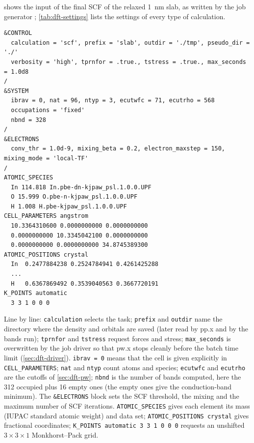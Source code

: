  shows the input of the final SCF of the relaxed 1~nm slab, as written by the job
generator ; \cref{tab:dft-settings} lists the settings of every type of
calculation.

\begin{lstlisting}[numbers=none, caption={Input of the final SCF of the relaxed 1~nm slab (\texttt{slab1r\_final\_cpu/scf.in}); the 96 atomic positions are shortened to three.}, label={lst:dft-input}]
&CONTROL
  calculation = 'scf', prefix = 'slab', outdir = './tmp', pseudo_dir = './'
  verbosity = 'high', tprnfor = .true., tstress = .true., max_seconds = 1.0d8
/
&SYSTEM
  ibrav = 0, nat = 96, ntyp = 3, ecutwfc = 71, ecutrho = 568
  occupations = 'fixed'
  nbnd = 328
/
&ELECTRONS
  conv_thr = 1.0d-9, mixing_beta = 0.2, electron_maxstep = 150, mixing_mode = 'local-TF'
/
ATOMIC_SPECIES
  In 114.818 In.pbe-dn-kjpaw_psl.1.0.0.UPF
  O 15.999 O.pbe-n-kjpaw_psl.1.0.0.UPF
  H 1.008 H.pbe-kjpaw_psl.1.0.0.UPF
CELL_PARAMETERS angstrom
  10.3364310600 0.0000000000 0.0000000000
  0.0000000000 10.3345042100 0.0000000000
  0.0000000000 0.0000000000 34.8745389300
ATOMIC_POSITIONS crystal
  In  0.2477884238 0.2524784941 0.4261425288
  ...
  H   0.6367869492 0.3539040563 0.3667720191
K_POINTS automatic
  3 3 1 0 0 0
\end{lstlisting}

Line by line: \texttt{calculation} selects the task; \texttt{prefix} and \texttt{outdir} name the directory where the
density and orbitals are saved (later read by pp.x and by the bands run); \texttt{tprnfor} and \texttt{tstress} request
forces and stress; \texttt{max\_seconds} is overwritten by the job driver so that pw.x stops cleanly before the batch
time limit (\cref{sec:dft-driver}). \texttt{ibrav = 0} means that the cell is given explicitly in
\texttt{CELL\_PARAMETERS}; \texttt{nat} and \texttt{ntyp} count atoms and species; \texttt{ecutwfc} and \texttt{ecutrho}
are the cutoffs of \cref{sec:dft-pw}; \texttt{nbnd} is the number of bands computed, here the 312 occupied plus 16
empty ones (the empty ones give the conduction-band minimum). The \texttt{\&ELECTRONS} block sets the SCF threshold, the
mixing and the maximum number of SCF iterations. \texttt{ATOMIC\_SPECIES} gives each element its mass (IUPAC standard
atomic weight) and data set; \texttt{ATOMIC\_POSITIONS crystal} gives fractional coordinates; \texttt{K\_POINTS
automatic 3 3 1 0 0 0} requests an unshifted $3\times3\times1$ Monkhorst--Pack grid.

